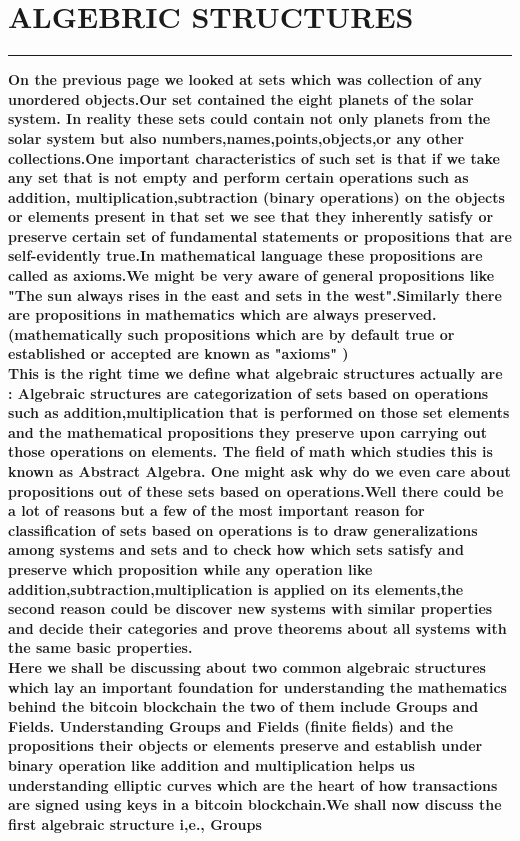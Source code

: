 \documentclass{article}
\begin{document}
\section * {ALGEBRIC STRUCTURES}
\hrule
\bigskip
\textbf{On the previous page we looked at sets which was collection of any unordered objects.Our set contained the eight planets of the solar system. In reality these sets could contain not only planets from the solar system but also  numbers,names,points,objects,or any other  collections.One important characteristics of such set is that if we take any set that is not empty  and perform certain operations such as addition, multiplication,subtraction (binary operations) on the objects or elements present in that set we see that  they inherently satisfy or preserve certain set of fundamental statements or propositions that are self-evidently true.In mathematical language these propositions are called as axioms.We might be very aware of general propositions
like   "The sun always rises in the east and sets in the west".Similarly there are propositions in mathematics which are always preserved. (mathematically such propositions which are by default true or established or accepted are known as  "axioms" ) 
\\
This is the right time we define what algebraic structures actually are : Algebraic structures are categorization of sets based on operations such as addition,multiplication that is performed on those set elements and the mathematical propositions they preserve upon carrying out those operations on elements. The field of math which studies this is known as Abstract Algebra.  One might ask why do we even care about propositions out of these sets based on operations.Well there could be a lot of reasons but a few of the most important reason for classification of sets based on operations  is to draw generalizations among systems and sets and to check how which sets satisfy and preserve which proposition while any operation like addition,subtraction,multiplication is applied on its elements,the second reason could be discover new systems with similar properties and decide their categories and prove theorems about all systems with the same basic properties.}
\\
\textbf{ Here we shall be discussing about two common algebraic  structures which lay an important foundation for understanding the mathematics behind the bitcoin blockchain the two of them include Groups and Fields. Understanding Groups and Fields (finite fields) and the propositions their objects or elements preserve and  establish  under binary operation like addition and multiplication helps us understanding elliptic curves which are the heart of how transactions are signed using keys in a bitcoin blockchain.We shall now discuss the first algebraic structure i,e., Groups}
\pagebreak
\end{document}

